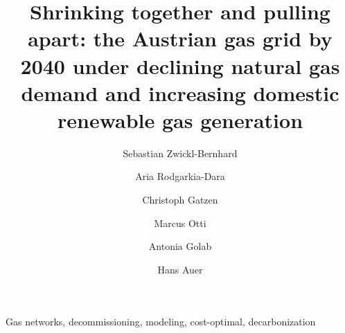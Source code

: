 \documentclass[review]{elsarticle}
\begin{document}
\begin{frontmatter}

\title{Shrinking together and pulling apart: the Austrian gas grid by 2040 under declining natural gas demand and increasing domestic renewable gas generation}
\author[1,2]{Sebastian Zwickl-Bernhard}
\author[3]{Aria Rodgarkia-Dara}
\author[3]{Christoph Gatzen}
\author[1]{Marcus Otti}
\author[1]{Antonia Golab}
\author[1,2]{Hans Auer}
\address[1]{Energy Economics Group (EEG), Technische Universität Wien, Gusshausstrasse 25-29/E370-3, 1040 Wien, Austria}
\address[2]{Industrial Economics and Technology Management, Norwegian University of Science and Technology, Gløshaugen, Alfred Getz vei 3, Trondheim, 7491, Norway}
\address[3]{Frontier Economics Limited, 71 High Holborn, London WC1V 6DA, United Kingdom}

\begin{abstract}
\end{abstract}

\begin{keyword}
	Gas networks, decommissioning, modeling, cost-optimal, decarbonization
\end{keyword}
\end{frontmatter}
%
\end{document}
